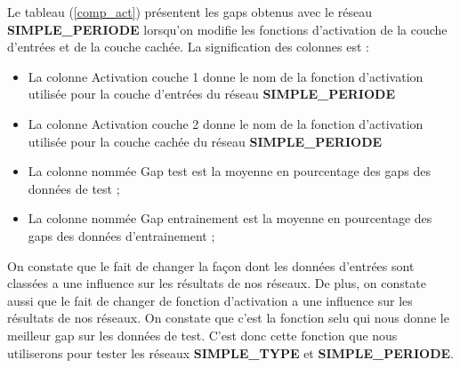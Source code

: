 Le tableau (\ref{comp_act}) présentent les gaps obtenus avec le réseau \textbf{SIMPLE\_PERIODE} lorsqu'on modifie les fonctions d'activation de la couche d'entrées et de la couche cachée. La signification des colonnes est :
\begin{itemize}[label=$\square$]
	\item La colonne \og Activation couche 1 \fg{} donne le nom de la fonction d'activation utilisée pour la couche d'entrées du réseau \textbf{SIMPLE\_PERIODE}
	\item La colonne \og Activation couche 2 \fg{} donne le nom de la fonction d'activation utilisée pour la couche cachée du réseau \textbf{SIMPLE\_PERIODE}
	\item La colonne nommée \og  Gap test\fg{} est la moyenne en pourcentage des gaps des données de test ;
	\item La colonne nommée \og Gap entrainement \fg{} est la moyenne en pourcentage des gaps des données d'entrainement ;
	
\end{itemize}

On constate que le fait de changer la façon dont les données d'entrées sont classées a une influence sur les résultats de nos réseaux. De plus, on constate aussi que le fait de changer de fonction d'activation a une influence sur les résultats de nos réseaux.
 On constate que c'est la fonction selu qui nous donne le meilleur gap sur les données de test. C'est donc cette fonction que nous utiliserons pour tester les réseaux \textbf{SIMPLE\_TYPE} et \textbf{SIMPLE\_PERIODE}.

